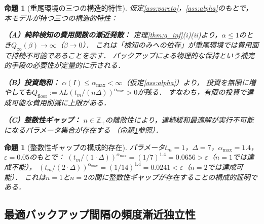 \documentclass[12pt,a4paper]{article}
\theoremstyle{plain}
\newtheorem{proposition}[theorem]{命題}
\theoremstyle{definition}
\theoremstyle{remark}
\newcommand{\Z}{\mathbb{Z}}
\newcommand{\Qinf}{Q_{\infty}}
\newcommand{\alphI}{\alpha(I)}
\begin{document}
\begin{proposition}[重尾環境の三つの構造的特性]\label{prop:structural_diff}
仮定\ref{ass:pareto}，\ref{ass:alpha}のもとで，本モデルが持つ三つの構造的特性：

\noindent\textbf{（A）純粋検知の費用関数の漸近発散：}
定理\ref{thm:q_inf}(i)(ii)より，$\alpha\le1$のとき$\Qinf(\beta)\to\infty$（$\beta\to0$）．
これは「検知のみへの依存」が重尾環境では費用面で持続不可能であることを示す．
バックアップによる物理的な保持という補完的手段の必要性が定量的に示される．

\noindent\textbf{（B）投資飽和：}
$\alphI\le\alpha_{\max}<\infty$（仮定\ref{ass:alpha}）より，
投資を無限に増やしても$Q_{\mathrm{floor}}:=\lambda L(t_m/(n\Delta))^{\alpha_{\max}}>0$が残る．
すなわち，有限の投資で達成可能な費用削減に上限がある．

\noindent\textbf{（C）整数性ギャップ：}
$n\in\Z_+$の離散性により，連続緩和最適解が実行不可能になるパラメータ集合が存在する
（命題\ref{prop:gap}参照）．
\end{proposition}

\begin{proposition}[整数性ギャップの構成的存在]\label{prop:gap}
パラメータ$t_m=1$，$\Delta=7$，$\alpha_{\max}=1.4$，$\varepsilon=0.05$のもとで：
$(t_m/(1\cdot\Delta))^{\alpha_{\max}}=(1/7)^{1.4}=0.0656>\varepsilon$（$n=1$では達成不能），
$(t_m/(2\cdot\Delta))^{\alpha_{\max}}=(1/14)^{1.4}=0.0241<\varepsilon$（$n=2$では達成可能）．
これは$n=1$と$n=2$の間に整数性ギャップが存在することの構成的証明である．
\end{proposition}

\subsection{最適バックアップ間隔の頻度漸近独立性}
\end{document}
